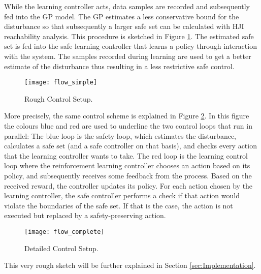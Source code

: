 \documentclass[../main.tex]{subfiles}
\begin{document}
While the learning controller acts, data samples are recorded and subsequently fed into the GP model. The GP estimates a less conservative bound for the disturbance so that subsequently a larger safe set can be calculated with HJI reachability analysis. This procedure is sketched in Figure \ref{fig:flow_simple}. The estimated safe set is fed into the safe learning controller that learns a policy through interaction with the system. The samples recorded during learning are used to get a better estimate of the disturbance thus resulting in a less restrictive safe control.\par
\begin{figure}
    \centering
    \texttt{[image: flow\_simple]}
    \caption{Rough Control Setup.}
    \label{fig:flow_simple}
\end{figure}
More precisely, the same control scheme is explained in Figure \ref{fig:flow_complete}. In this figure the colours blue and red are used to underline the two control loops that run in parallel: The blue loop is the safety loop, which estimates the disturbance, calculates a safe set (and a safe controller on that basis), and checks every action that the learning controller wants to take. The red loop is the learning control loop where the reinforcement learning controller chooses an action based on its policy, and subsequently receives some feedback from the process. Based on the received reward, the controller updates its policy. For each action chosen by the learning controller, the safe controller performs a check if that action would violate the boundaries of the safe set. If that is the case, the action is not executed but replaced by a safety-preserving action.
\begin{figure}
    \centering
    \texttt{[image: flow\_complete]}
    \caption{Detailed Control Setup.}
    \label{fig:flow_complete}
\end{figure}
This very rough sketch will be further explained in Section \ref{sec:Implementation}.
\end{document}
